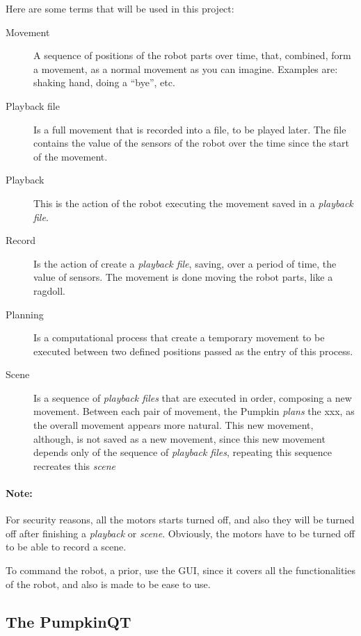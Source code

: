 \documentclass[oneside,a4paper,titlepage]{article}
\begin{document}
Here are some terms that will be used in this project:

\begin{description}
	\item[Movement] A sequence of positions of the robot parts over time, that, combined, form a movement, as a normal movement as you can imagine. Examples are: shaking hand, doing a ``bye'', etc.
	
	\item[Playback file] Is a full movement that is recorded into a file, to be played later. The file contains the value of the sensors of the robot over the time since the start of the movement.
	
	\item[Playback] This is the action of the robot executing the movement saved in a \emph{playback file}.
	
	\item[Record] Is the action of create a \emph{playback file}, saving, over a period of time, the value of sensors. The movement is done moving the robot parts, like a ragdoll.
	
	\item[Planning] Is a computational process that create a temporary movement to be executed between two defined positions passed as the entry of this process.
	
	\item[Scene] Is a sequence of \emph{playback files} that are executed in order, composing a new movement. Between each pair of movement, the Pumpkin \emph{plans} the xxx, as the overall movement appears more natural. This new movement, although, is not saved as a new movement, since this new movement depends only of the sequence of \emph{playback files}, repeating this sequence recreates this \emph{scene}
\end{description}

\paragraph{Note: } For security reasons, all the motors starts turned off, and also they will be turned off after finishing a \emph{playback} or \emph{scene}. Obviously, the motors have to be turned off to be able to record a scene.

To command the robot, a prior, use the GUI, since it covers all the functionalities of the robot, and also is made to be ease to use.

\subsection{The PumpkinQT}
\end{document}
